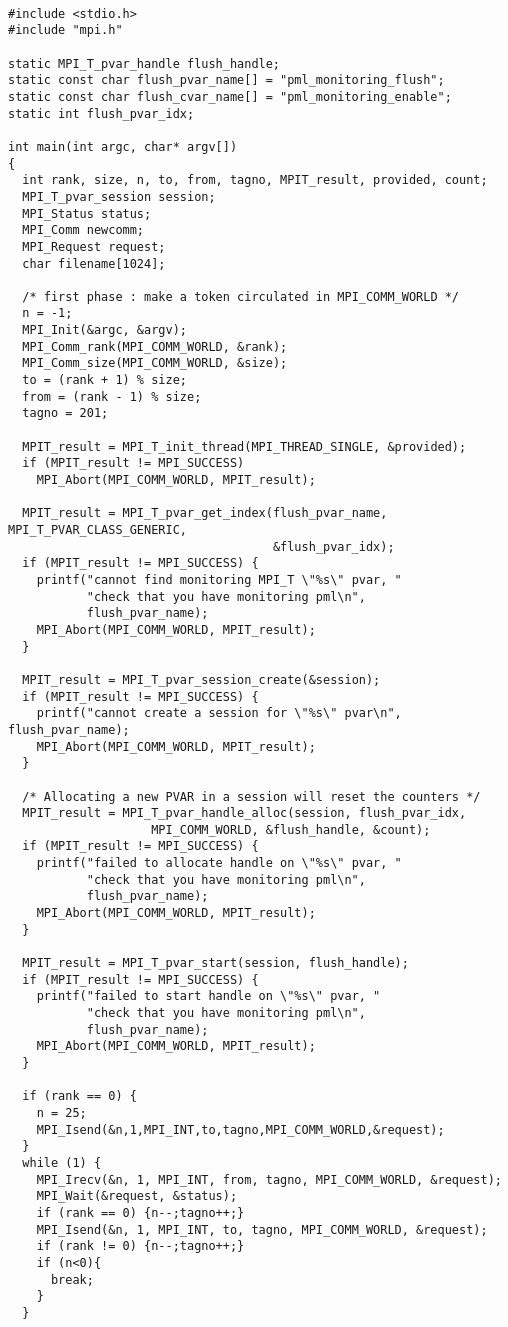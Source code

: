 \documentclass[notitlepage]{article}
\begin{document}
\begin{verbatim}
  
#include <stdio.h>
#include "mpi.h"

static MPI_T_pvar_handle flush_handle;
static const char flush_pvar_name[] = "pml_monitoring_flush";
static const char flush_cvar_name[] = "pml_monitoring_enable";
static int flush_pvar_idx;

int main(int argc, char* argv[])
{
  int rank, size, n, to, from, tagno, MPIT_result, provided, count;
  MPI_T_pvar_session session;
  MPI_Status status;
  MPI_Comm newcomm;
  MPI_Request request;
  char filename[1024];

  /* first phase : make a token circulated in MPI_COMM_WORLD */
  n = -1;
  MPI_Init(&argc, &argv);
  MPI_Comm_rank(MPI_COMM_WORLD, &rank);
  MPI_Comm_size(MPI_COMM_WORLD, &size);
  to = (rank + 1) % size;
  from = (rank - 1) % size;
  tagno = 201;

  MPIT_result = MPI_T_init_thread(MPI_THREAD_SINGLE, &provided);
  if (MPIT_result != MPI_SUCCESS)
    MPI_Abort(MPI_COMM_WORLD, MPIT_result);

  MPIT_result = MPI_T_pvar_get_index(flush_pvar_name, MPI_T_PVAR_CLASS_GENERIC, 
                                     &flush_pvar_idx);
  if (MPIT_result != MPI_SUCCESS) {
    printf("cannot find monitoring MPI_T \"%s\" pvar, "
           "check that you have monitoring pml\n",
           flush_pvar_name);
    MPI_Abort(MPI_COMM_WORLD, MPIT_result);
  }

  MPIT_result = MPI_T_pvar_session_create(&session);
  if (MPIT_result != MPI_SUCCESS) {
    printf("cannot create a session for \"%s\" pvar\n", flush_pvar_name);
    MPI_Abort(MPI_COMM_WORLD, MPIT_result);
  }

  /* Allocating a new PVAR in a session will reset the counters */
  MPIT_result = MPI_T_pvar_handle_alloc(session, flush_pvar_idx,
					MPI_COMM_WORLD, &flush_handle, &count);
  if (MPIT_result != MPI_SUCCESS) {
    printf("failed to allocate handle on \"%s\" pvar, "
           "check that you have monitoring pml\n",
           flush_pvar_name);
    MPI_Abort(MPI_COMM_WORLD, MPIT_result);
  }

  MPIT_result = MPI_T_pvar_start(session, flush_handle);
  if (MPIT_result != MPI_SUCCESS) {
    printf("failed to start handle on \"%s\" pvar, "
           "check that you have monitoring pml\n",
           flush_pvar_name);
    MPI_Abort(MPI_COMM_WORLD, MPIT_result);
  }

  if (rank == 0) {
    n = 25;
    MPI_Isend(&n,1,MPI_INT,to,tagno,MPI_COMM_WORLD,&request);
  }
  while (1) {
    MPI_Irecv(&n, 1, MPI_INT, from, tagno, MPI_COMM_WORLD, &request);
    MPI_Wait(&request, &status);
    if (rank == 0) {n--;tagno++;}
    MPI_Isend(&n, 1, MPI_INT, to, tagno, MPI_COMM_WORLD, &request);
    if (rank != 0) {n--;tagno++;}
    if (n<0){
      break;
    }
  }


\end{verbatim}
\end{document}
